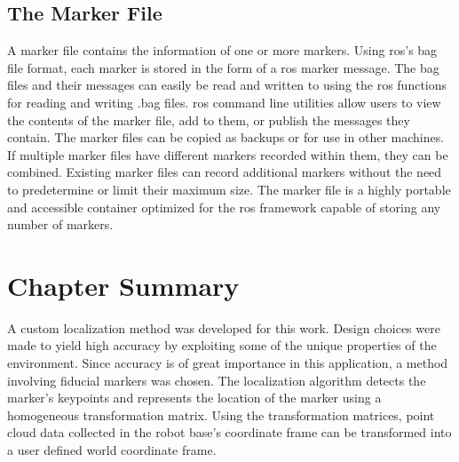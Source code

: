 \subsection{The Marker File}
A marker file contains the information of one or more markers. Using \acrshort{ros}'s bag file format, each marker is stored in the form of a \acrshort{ros} marker message. The bag files and their messages can easily be read and written to using the \acrshort{ros} functions for reading and writing .bag files. \acrshort{ros} command line utilities allow users to view the contents of the marker file, add to them, or publish the messages they contain. The marker files can be copied as backups or for use in other machines. If multiple marker files have different markers recorded within them, they can be combined. Existing marker files can record additional markers without the need to predetermine or limit their maximum size. The marker file is a highly portable and accessible container optimized for the \acrshort{ros} framework capable of storing any number of markers.\\

\section{Chapter Summary}
A custom localization method was developed for this work. Design choices were made to yield high accuracy by exploiting some of the unique properties of the environment. Since accuracy is of great importance in this application, a method involving fiducial markers was chosen. The localization algorithm detects the marker's keypoints and represents the location of the marker using a homogeneous transformation matrix. Using the transformation matrices, point cloud data collected in the robot base's coordinate frame can be transformed into a user defined world coordinate frame.\\